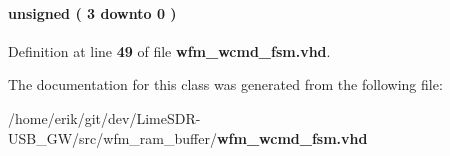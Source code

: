 \paragraph[{wrburst\+\_\+cnt}]{ {\bfseries \textcolor{comment}{unsigned}\textcolor{vhdlchar}{ }\textcolor{vhdlchar}{(}\textcolor{vhdlchar}{ }\textcolor{vhdlchar}{ } \textcolor{vhdldigit}{3} \textcolor{vhdlchar}{ }\textcolor{keywordflow}{downto}\textcolor{vhdlchar}{ }\textcolor{vhdlchar}{ } \textcolor{vhdldigit}{0} \textcolor{vhdlchar}{ }\textcolor{vhdlchar}{)}\textcolor{vhdlchar}{ }} \hspace{0.3cm}{\ttfamily [Signal]}}\label{classwfm__wcmd__fsm_1_1arch_afba82b22ee2c07479fecfe4d16bd3f31}


Definition at line {\bf 49} of file {\bf wfm\+\_\+wcmd\+\_\+fsm.\+vhd}.



The documentation for this class was generated from the following file\+:\begin{DoxyCompactItemize}
\item 
/home/erik/git/dev/\+Lime\+S\+D\+R-\/\+U\+S\+B\+\_\+\+G\+W/src/wfm\+\_\+ram\+\_\+buffer/{\bf wfm\+\_\+wcmd\+\_\+fsm.\+vhd}\end{DoxyCompactItemize}
